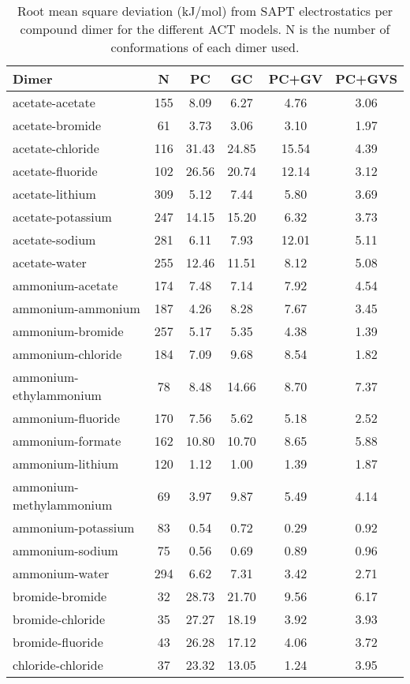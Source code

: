 \begin{longtable}{lccccc}
\caption{Root mean square deviation (kJ/mol) from SAPT electrostatics per compound dimer for the different ACT models. N is the number of conformations of each dimer used.}\\
\hline
Dimer & N  & PC & GC & PC+GV & PC+GVS\\
\hline
acetate-acetate & 155  & 8.09 & 6.27 & 4.76 & 3.06\\
acetate-bromide & 61  & 3.73 & 3.06 & 3.10 & 1.97\\
acetate-chloride & 116  & 31.43 & 24.85 & 15.54 & 4.39\\
acetate-fluoride & 102  & 26.56 & 20.74 & 12.14 & 3.12\\
acetate-lithium & 309  & 5.12 & 7.44 & 5.80 & 3.69\\
acetate-potassium & 247  & 14.15 & 15.20 & 6.32 & 3.73\\
acetate-sodium & 281  & 6.11 & 7.93 & 12.01 & 5.11\\
acetate-water & 255  & 12.46 & 11.51 & 8.12 & 5.08\\
ammonium-acetate & 174  & 7.48 & 7.14 & 7.92 & 4.54\\
ammonium-ammonium & 187  & 4.26 & 8.28 & 7.67 & 3.45\\
ammonium-bromide & 257  & 5.17 & 5.35 & 4.38 & 1.39\\
ammonium-chloride & 184  & 7.09 & 9.68 & 8.54 & 1.82\\
ammonium-ethylammonium & 78  & 8.48 & 14.66 & 8.70 & 7.37\\
ammonium-fluoride & 170  & 7.56 & 5.62 & 5.18 & 2.52\\
ammonium-formate & 162  & 10.80 & 10.70 & 8.65 & 5.88\\
ammonium-lithium & 120  & 1.12 & 1.00 & 1.39 & 1.87\\
ammonium-methylammonium & 69  & 3.97 & 9.87 & 5.49 & 4.14\\
ammonium-potassium & 83  & 0.54 & 0.72 & 0.29 & 0.92\\
ammonium-sodium & 75  & 0.56 & 0.69 & 0.89 & 0.96\\
ammonium-water & 294  & 6.62 & 7.31 & 3.42 & 2.71\\
bromide-bromide & 32  & 28.73 & 21.70 & 9.56 & 6.17\\
bromide-chloride & 35  & 27.27 & 18.19 & 3.92 & 3.93\\
bromide-fluoride & 43  & 26.28 & 17.12 & 4.06 & 3.72\\
chloride-chloride & 37  & 23.32 & 13.05 & 1.24 & 3.95\\

\end{longtable}
